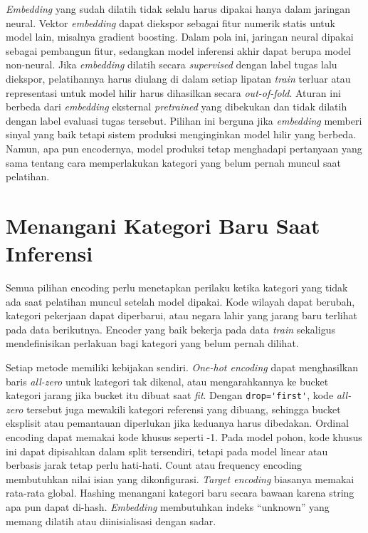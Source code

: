 \emph{Embedding} yang sudah dilatih tidak selalu harus dipakai hanya dalam jaringan neural. Vektor \emph{embedding} dapat diekspor sebagai fitur numerik statis untuk model lain, misalnya gradient boosting. Dalam pola ini, jaringan neural dipakai sebagai pembangun fitur, sedangkan model inferensi akhir dapat berupa model non-neural. Jika \emph{embedding} dilatih secara \emph{supervised} dengan label tugas lalu diekspor, pelatihannya harus diulang di dalam setiap lipatan \emph{train} terluar atau representasi untuk model hilir harus dihasilkan secara \emph{out-of-fold}. Aturan ini berbeda dari \emph{embedding} eksternal \emph{pretrained} yang dibekukan dan tidak dilatih dengan label evaluasi tugas tersebut. Pilihan ini berguna jika \emph{embedding} memberi sinyal yang baik tetapi sistem produksi menginginkan model hilir yang berbeda. Namun, apa pun encodernya, model produksi tetap menghadapi pertanyaan yang sama tentang cara memperlakukan kategori yang belum pernah muncul saat pelatihan.

\section{Menangani Kategori Baru Saat Inferensi}\label{menangani-kategori-baru-saat-inferensi}

Semua pilihan encoding perlu menetapkan perilaku ketika kategori yang tidak ada saat pelatihan muncul setelah model dipakai. Kode wilayah dapat berubah, kategori pekerjaan dapat diperbarui, atau negara lahir yang jarang baru terlihat pada data berikutnya. Encoder yang baik bekerja pada data \emph{train} sekaligus mendefinisikan perlakuan bagi kategori yang belum pernah dilihat.

Setiap metode memiliki kebijakan sendiri. \emph{One-hot encoding} dapat menghasilkan baris \emph{all-zero} untuk kategori tak dikenal, atau mengarahkannya ke bucket kategori jarang jika bucket itu dibuat saat \emph{fit}. Dengan \passthrough{\lstinline!drop='first'!}, kode \emph{all-zero} tersebut juga mewakili kategori referensi yang dibuang, sehingga bucket eksplisit atau pemantauan diperlukan jika keduanya harus dibedakan. Ordinal encoding dapat memakai kode khusus seperti -1. Pada model pohon, kode khusus ini dapat dipisahkan dalam split tersendiri, tetapi pada model linear atau berbasis jarak tetap perlu hati-hati. Count atau frequency encoding membutuhkan nilai isian yang dikonfigurasi. \emph{Target encoding} biasanya memakai rata-rata global. Hashing menangani kategori baru secara bawaan karena string apa pun dapat di-hash. \emph{Embedding} membutuhkan indeks ``unknown'' yang memang dilatih atau diinisialisasi dengan sadar.

